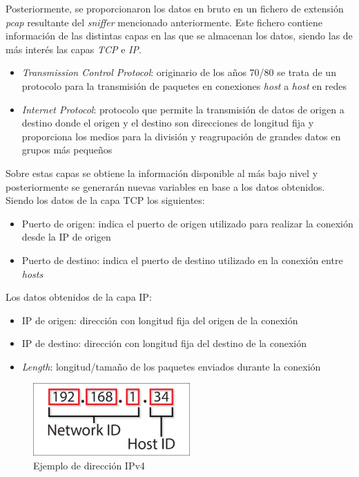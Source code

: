 Posteriormente, se proporcionaron los datos en bruto en un fichero de extensión \textit{pcap} resultante del \textit{sniffer} mencionado anteriormente. Este fichero contiene información de las distintas capas en las que se almacenan los datos, siendo las de más interés las capas \textit{TCP} e \textit{IP}.

\begin{itemize}
    \item \textit{Transmission Control Protocol}: originario de los años 70/80 se trata de un protocolo para la transmisión de paquetes en conexiones \textit{host} a \textit{host} en redes \cite{postel1981transmission}
    \item \textit{Internet Protocol}: protocolo que permite la transmisión de datos de origen a destino donde el origen y el destino son direcciones de longitud fija y proporciona los medios para la división y reagrupación de grandes datos en grupos más pequeños \cite{postel1981internet} 
\end{itemize}

Sobre estas capas se obtiene la información disponible al más bajo nivel y posteriormente se generarán nuevas variables en base a los datos obtenidos. Siendo los datos de la capa TCP los siguientes:

\begin{itemize}
    \item Puerto de origen: indica el puerto de origen utilizado para realizar la conexión desde la IP de origen
    \item Puerto de destino: indica el puerto de destino utilizado en la conexión entre \textit{hosts}
\end{itemize}
\newpage

Los datos obtenidos de la capa IP:
\begin{itemize}
    \item IP de origen: dirección con longitud fija del origen de la conexión
    \item IP de destino: dirección con longitud fija del destino de la conexión
    \item \textit{Length}: longitud/tamaño de los paquetes enviados durante la conexión
\end{itemize}

\begin{figure}[H]
    \centering
    \includegraphics[width=6cm]{figs/ip.png}
    \caption{Ejemplo de dirección IPv4}
    \label{fig:wireshark}
\end{figure}

